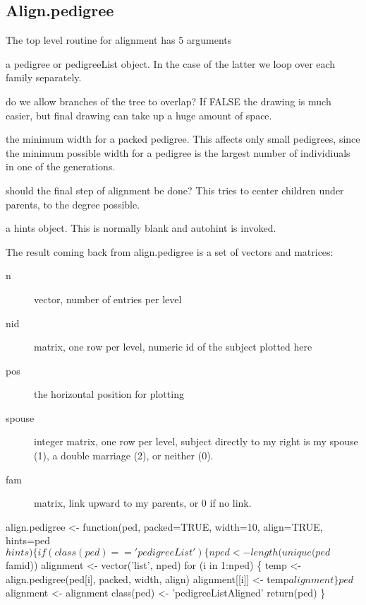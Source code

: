 \documentclass{article}
\begin{document}
\subsection{Align.pedigree}
\label{sect:alignped}
The top level routine for alignment has 5 arguments
\begin{description}
    \item[ped] a pedigree or pedigreeList object. In the case of
      the latter we loop over each family separately.
    \item[packed] do we allow branches of the tree to overlap?  
      If FALSE the drawing is much easier, but final drawing can
      take up a huge amount of space.  
    \item[width] the minimum width for a packed pedigree. This
      affects only small pedigrees, since the minimum possible
      width for a pedigree is the largest number of individiuals in
      one of the generations.
    \item[align] should the final step of alignment be done?  This
      tries to center children under parents, to the degree possible.
    \item a hints object.  This is normally blank and autohint
      is invoked. 
\end{description}
The result coming back from align.pedigree is a set of vectors and
matrices:
\begin{description}
  \item[n] vector, number of entries per level
  \item[nid] matrix, one row per level, numeric id of the subject plotted
    here
  \item[pos] the horizontal position for plotting
  \item[spouse] integer matrix, one row per level, subject directly to my
    right is my spouse (1), a double marriage (2), or neither (0).
  \item[fam] matrix, link upward to my parents, or 0 if no link.
\end{description}
\nwenddocs{}\endmoddef
align.pedigree <- function(ped, packed=TRUE, width=10,
                           align=TRUE, hints=ped$hints) \{
    if (class(ped)== 'pedigreeList') \{
        nped <- length(unique(ped$famid))
        alignment <- vector('list', nped)
        for (i in 1:nped) \{
            temp <- align.pedigree(ped[i], packed, width, align)
            alignment[[i]] <- temp$alignment
            \}
        ped$alignment <- alignment
        class(ped) <- 'pedigreeListAligned'
        return(ped)
        \}
    
\end{document}
